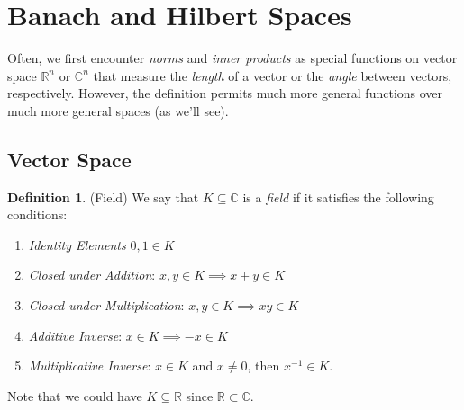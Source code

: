 \documentclass[12pt]{article}
\numberwithin{equation}{section} %
\theoremstyle{plain}
\theoremstyle{definition}
\newtheorem{defn}[thm]{Definition}
\theoremstyle{remark}
\newcommand{\R}{\mathbb{R}}
\newcommand{\Rn}{\mathbb{R}^n}
\newcommand{\C}{\mathbb{C}}
\newcommand{\Cn}{\mathbb{C}^n}
\begin{document}
\clearpage
\section{Banach and Hilbert Spaces}
\label{sec:banachhilbert}

Often, we first encounter \emph{norms} and \emph{inner products} as
special functions on vector space $\Rn$ or $\Cn$ that measure the
\emph{length} of a vector or the \emph{angle} between vectors,
respectively.  However, the definition permits much more general
functions over much more general spaces (as we'll see).

\subsection{Vector Space}

\begin{defn}(Field)
We say that $K\subseteq \C$ is a \emph{field} if it satisfies the following
conditions:
\begin{enumerate}[label=(\roman*)]
  \item \emph{Identity Elements} $0,1\in K$
  \item \emph{Closed under Addition}:
      $x,y\in K \implies x+y\in K$
  \item \emph{Closed under Multiplication}:
      $x,y\in K \implies xy\in K$
  \item \emph{Additive Inverse}: $x\in K \implies -x\in K$
  \item \emph{Multiplicative Inverse}: $x\in K$ and $x\neq 0$, then
    $x^{-1}\in K$.
\end{enumerate}
Note that we could have $K \subseteq \R$ since $\R\subset\C$.
\end{defn}
\end{document}
